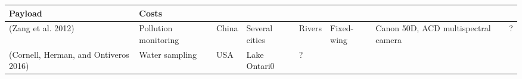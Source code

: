 \documentclass[]{interact}
\theoremstyle{plain}%
\theoremstyle{definition}
\theoremstyle{remark}
\begin{document}
\begin{longtable}[]{@{}llllllll@{}}
\begin{minipage}[b]{0.11\columnwidth}
Payload\strut
\end{minipage} & \begin{minipage}[b]{0.01\columnwidth}\raggedright\strut
Costs\strut
\end{minipage}\tabularnewline
\midrule
\endhead
\begin{minipage}[t]{0.11\columnwidth}\raggedright\strut
(Zang et al. 2012)\strut
\end{minipage} & \begin{minipage}[t]{0.18\columnwidth}\raggedright\strut
Pollution monitoring\strut
\end{minipage} & \begin{minipage}[t]{0.03\columnwidth}\raggedright\strut
China\strut
\end{minipage} & \begin{minipage}[t]{0.14\columnwidth}\raggedright\strut
Several cities\strut
\end{minipage} & \begin{minipage}[t]{0.10\columnwidth}\raggedright\strut
Rivers\strut
\end{minipage} & \begin{minipage}[t]{0.09\columnwidth}\raggedright\strut
Fixed-wing\strut
\end{minipage} & \begin{minipage}[t]{0.11\columnwidth}\raggedright\strut
Canon 50D, ACD multispectral camera\strut
\end{minipage} & \begin{minipage}[t]{0.01\columnwidth}\raggedright\strut
?\strut
\end{minipage}\tabularnewline
\begin{minipage}[t]{0.11\columnwidth}\raggedright\strut
(Cornell, Herman, and Ontiveros 2016)\strut
\end{minipage} & \begin{minipage}[t]{0.18\columnwidth}\raggedright\strut
Water sampling\strut
\end{minipage} & \begin{minipage}[t]{0.03\columnwidth}\raggedright\strut
USA\strut
\end{minipage} & \begin{minipage}[t]{0.14\columnwidth}\raggedright\strut
Lake Ontari0\strut
\end{minipage} & \begin{minipage}[t]{0.10\columnwidth}\raggedright\strut
?\strut
\end{minipage} & \begin{minipage}[t]{0.09\columnwidth}\raggedright\strut

\end{minipage}
\end{longtable}
\end{document}
